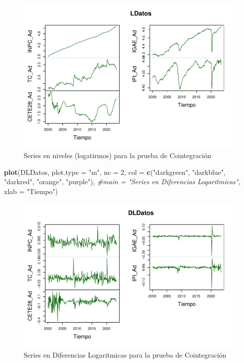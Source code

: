\documentclass[
]{book}
\newenvironment{Shaded}{\begin{snugshade}}{\end{snugshade}}
\newcommand{\AttributeTok}[1]{\textcolor[rgb]{0.13,0.29,0.53}{#1}}
\newcommand{\CommentTok}[1]{\textcolor[rgb]{0.56,0.35,0.01}{\textit{#1}}}
\newcommand{\DecValTok}[1]{\textcolor[rgb]{0.00,0.00,0.81}{#1}}
\newcommand{\FunctionTok}[1]{\textcolor[rgb]{0.13,0.29,0.53}{\textbf{#1}}}
\newcommand{\NormalTok}[1]{#1}
\newcommand{\StringTok}[1]{\textcolor[rgb]{0.31,0.60,0.02}{#1}}
\begin{document}
\begin{figure}

{\centering \includegraphics{Notas-Series-Tiempo_files/figure-latex/fig81-1} 

}

\caption{Series en niveles (logatirmos) para la prueba de Cointegración}\label{fig:fig81}
\end{figure}

\begin{Shaded}
\begin{Highlighting}[]
\FunctionTok{plot}\NormalTok{(DLDatos, }
     \AttributeTok{plot.type =} \StringTok{"m"}\NormalTok{, }\AttributeTok{nc =} \DecValTok{2}\NormalTok{,}
     \AttributeTok{col =} \FunctionTok{c}\NormalTok{(}\StringTok{"darkgreen"}\NormalTok{, }\StringTok{"darkblue"}\NormalTok{, }\StringTok{"darkred"}\NormalTok{, }\StringTok{"orange"}\NormalTok{, }\StringTok{"purple"}\NormalTok{), }
     \CommentTok{\#main = "Series en Diferencias Logaritmicas", }
     \AttributeTok{xlab =} \StringTok{"Tiempo"}\NormalTok{)}
\end{Highlighting}
\end{Shaded}

\begin{figure}

{\centering \includegraphics{Notas-Series-Tiempo_files/figure-latex/fig82-1} 

}

\caption{Series en Diferencias Logaritmicas para la prueba de Cointegración}\label{fig:fig82}
\end{figure}
\end{document}
